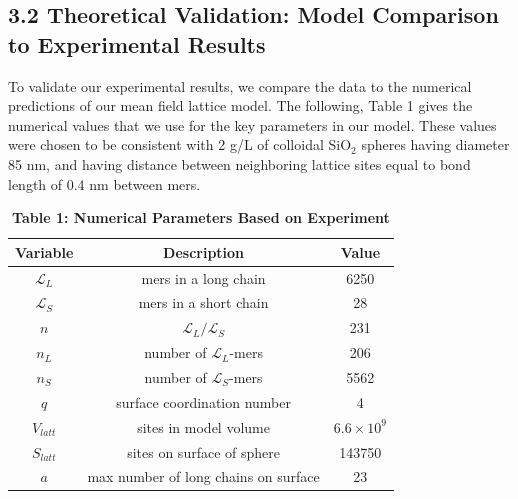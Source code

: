 \documentclass[journal=mamobx,manuscript=article]{achemso}
\newcommand{\leng}{\mathcal{L}}
\begin{document}
\subsection{3.2  Theoretical
Validation: Model Comparison to Experimental Results}    %
    \label{sec-res-theor}

To validate our experimental results, 
we compare the data to the numerical predictions of our mean field lattice model.
The following, Table 1 gives the numerical values that we use for the key parameters in our model.
These values were chosen to be consistent with 
2 g/L of colloidal SiO$_2$ spheres having diameter 85 nm, and having distance between neighboring lattice sites equal to bond length of 0.4 nm between mers.

\begin{table}
\begin{center}
\begin{tabular}{|c|c|c|}
    \hline
     Variable & Description  & Value   \\ \hline\hline
    $\leng_L$ &  mers in a long chain &  6250 \\  
    $\leng_S$ & mers in a short chain &28  \\
    $n$ & $\leng_L/\leng_S$  &   231  \\
    $n_L$ & number of $\leng_L$-mers & 206  \\
    $n_S$  & number of $\leng_S$-mers & 5562  \\
    $q$   & surface coordination number & 4  \\
    $V_{latt}$  & sites in model volume & $6.6\times          10^{9}$\\
    $S_{latt}$  & sites on surface of sphere  & 143750  \\
    $a$  & max number of long chains on surface & 23 \\
      \hline
\end{tabular}
\end{center}
\caption*{\textbf{Table 1: Numerical Parameters Based on Experiment}}
\end{table}
\end{document}

